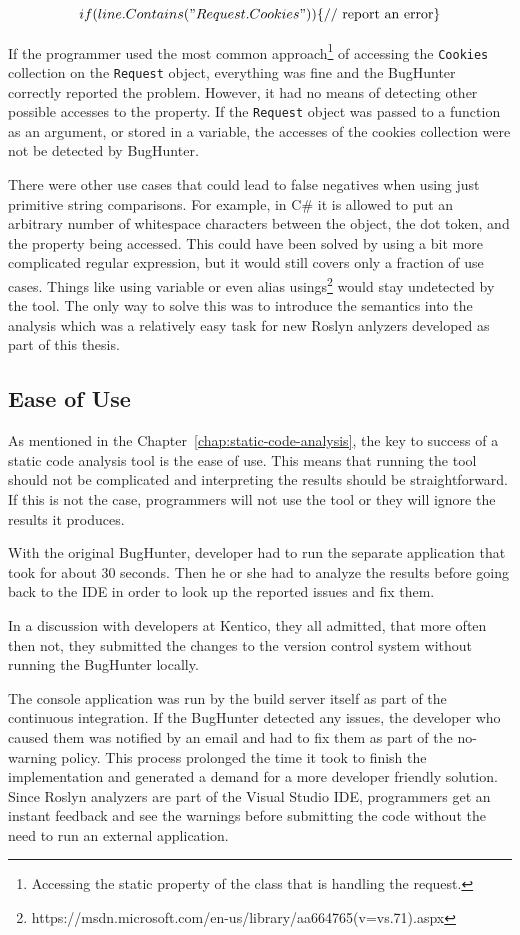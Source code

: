\documentclass[
  digital, %
  table,   %
  lof,     %
  lot,     %
  oneside,
]{fithesis3}
\begin{document}
$$
if (line.Contains("Request.Cookies")) \\
\{
  \textnormal{// report an error}
\}
$$

If the programmer used the most common approach\footnote{Accessing the static property of the class that is handling the request.} of accessing the \texttt{Cookies} collection on the \texttt{Request} object, everything was fine and the BugHunter correctly reported the problem. However, it had no means of detecting other possible accesses to the property. If the \texttt{Request} object was passed to a function as an argument, or stored in a variable, the accesses of the cookies collection were not be detected by BugHunter. 

There were other use cases that could lead to false negatives when using just primitive string comparisons. For example, in C\# it is allowed to put an arbitrary number of whitespace characters between the object, the dot token, and the property being accessed. This could have been solved by using a bit more complicated regular expression, but it would still covers only a fraction of use cases. Things like using variable or even alias usings\footnote{https://msdn.microsoft.com/en-us/library/aa664765(v=vs.71).aspx} would stay undetected by the tool. The only way to solve this was to introduce the semantics into the analysis which was a relatively easy task for new Roslyn anlyzers developed as part of this thesis.

\subsection{Ease of Use}
As mentioned in the Chapter~\ref{chap:static-code-analysis}, the key to success of a static code analysis tool is the ease of use. This means that running the tool should not be complicated and interpreting the results should be straightforward. If this is not the case, programmers will not use the tool or they will ignore the results it produces. 

With the original BugHunter, developer had to run the separate application that took for about 30 seconds. Then he or she had to analyze the results before going back to the IDE in order to look up the reported issues and fix them. 

In a discussion with developers at Kentico, they all admitted, that more often then not, they submitted the changes to the version control system without running the BugHunter locally. 

The console application was run by the build server itself as part of the continuous integration. If the BugHunter detected any issues, the developer who caused them was notified by an email and had to fix them as part of the no-warning policy. This process prolonged the time it took to finish the implementation and generated a demand for a more developer friendly solution. Since Roslyn analyzers are part of the Visual Studio IDE, programmers get an instant feedback and see the warnings before submitting the code without the need to run an external application.
\end{document}
